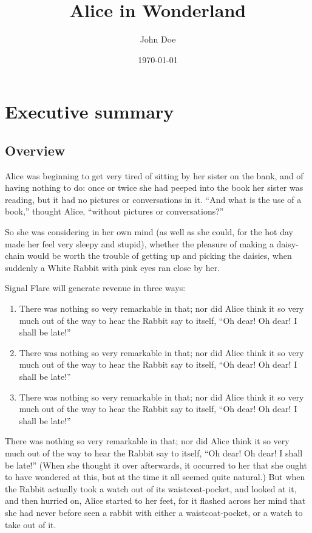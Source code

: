 \documentclass[12pt]{article}
\author{John Doe}
\date{\today}
\title{Alice in Wonderland}
\def\maketitle{ \newgeometry{margin=1in} \thispagestyle{empty} \vfill \null \cleardoublepage\restoregeometry}
\begin{document}
\maketitle
\tableofcontents
\newpage

\section{Executive summary}
\label{sec-1}
\subsection{Overview}
\label{sec-1-1}
Alice was beginning to get very tired of sitting by her sister on the bank, and of having nothing to do: once or twice she had peeped into the book her sister was reading, but it had no pictures or conversations in it. ``And what is the use of a book,'' thought Alice, ``without pictures or conversations?'' 

So she was considering in her own mind (as well as she could, for the hot day made her feel very sleepy and stupid), whether the pleasure of making a daisy-chain would be worth the trouble of getting up and picking the daisies, when suddenly a White Rabbit with pink eyes ran close by her. 

Signal Flare will generate revenue in three ways: 
\begin{enumerate}
\item There was nothing so very remarkable in that; nor did Alice think it so very much out of the way to hear the Rabbit say to itself, ``Oh dear! Oh dear! I shall be late!''
\item There was nothing so very remarkable in that; nor did Alice think it so very much out of the way to hear the Rabbit say to itself, ``Oh dear! Oh dear! I shall be late!''
\item There was nothing so very remarkable in that; nor did Alice think it so very much out of the way to hear the Rabbit say to itself, ``Oh dear! Oh dear! I shall be late!''
\end{enumerate}

There was nothing so very remarkable in that; nor did Alice think it so very much out of the way to hear the Rabbit say to itself, ``Oh dear! Oh dear! I shall be late!'' (When she thought it over afterwards, it occurred to her that she ought to have wondered at this, but at the time it all seemed quite natural.) But when the Rabbit actually took a watch out of its waistcoat-pocket, and looked at it, and then hurried on, Alice started to her feet, for it flashed across her mind that she had never before seen a rabbit with either a waistcoat-pocket, or a watch to take out of it. 
\end{document}
